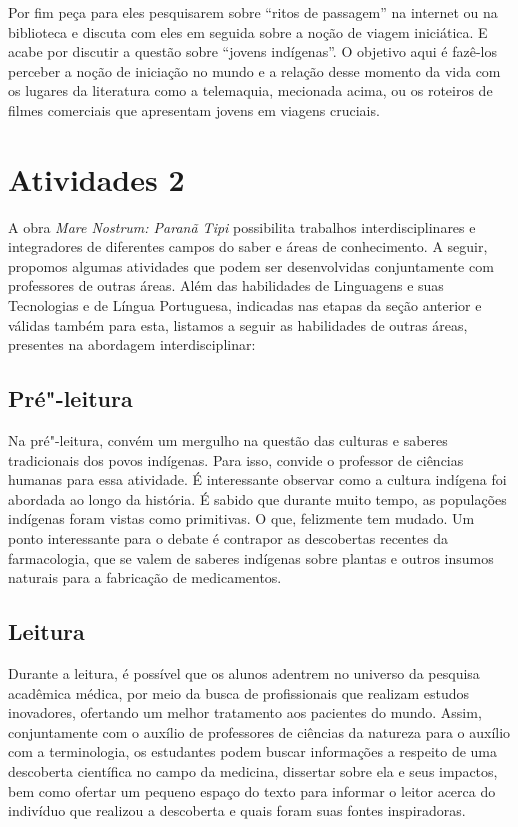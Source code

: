 \documentclass[12pt]{extarticle}
\begin{document}
Por fim peça para eles pesquisarem sobre ``ritos de passagem''
na internet ou na biblioteca e discuta com eles em seguida sobre a noção de viagem 
iniciática. E acabe por discutir a questão sobre ``jovens indígenas''. 
O objetivo aqui é fazê-los perceber a noção de iniciação no mundo e 
a relação desse momento da vida com os lugares da literatura como 
a telemaquia, mecionada acima, ou os roteiros de filmes comerciais
que apresentam jovens em viagens cruciais. 


\section{Atividades 2}

A obra \emph{Mare Nostrum: Paranã Tipi} possibilita trabalhos
interdisciplinares e integradores de diferentes campos do saber e áreas
de conhecimento. A seguir, propomos algumas atividades que podem ser
desenvolvidas conjuntamente com professores de outras áreas. Além das
habilidades de Linguagens e suas Tecnologias e de Língua Portuguesa,
indicadas nas etapas da seção anterior e válidas também para esta,
listamos a seguir as habilidades de outras áreas, presentes na abordagem
interdisciplinar:

\bnccreferenciasgerais


\subsection{Pré"-leitura}

Na pré"-leitura, convém um mergulho na questão das culturas e
saberes tradicionais dos povos indígenas. Para isso, convide o professor
de ciências humanas para essa atividade. É interessante observar como a
cultura indígena foi abordada ao longo da história. É sabido que durante
muito tempo, as populações indígenas foram vistas como primitivas. O
que, felizmente tem mudado. Um ponto interessante para o debate é
contrapor as descobertas recentes da farmacologia, que se valem de
saberes indígenas sobre plantas e outros insumos naturais para a
fabricação de medicamentos.

\subsection{Leitura}

Durante a leitura, é possível que os alunos adentrem no
universo da pesquisa acadêmica médica, por meio da busca de
profissionais que realizam estudos inovadores, ofertando um melhor
tratamento aos pacientes do mundo. Assim, conjuntamente com o auxílio de
professores de ciências da natureza para o auxílio com a terminologia,
os estudantes podem buscar informações a respeito de uma descoberta
científica no campo da medicina, dissertar sobre ela e seus impactos,
bem como ofertar um pequeno espaço do texto para informar o leitor
acerca do indivíduo que realizou a descoberta e quais foram suas fontes
inspiradoras.
\end{document}
